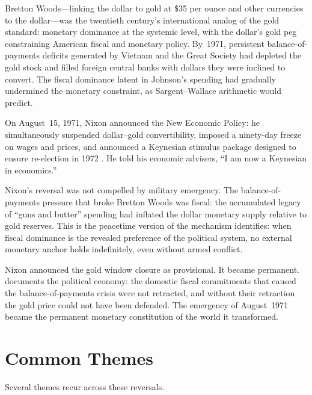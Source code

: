 \documentclass[12pt]{article}
\begin{document}
Bretton Woods---linking the dollar to gold at \$35 per ounce and other
currencies to the dollar---was the twentieth century's international
analog of the gold standard: monetary dominance at the systemic level,
with the dollar's gold peg constraining American fiscal and monetary
policy.  By~1971, persistent balance-of-payments deficits generated by
Vietnam and the Great Society had depleted the gold stock and filled
foreign central banks with dollars they were inclined to convert.  The
fiscal dominance latent in Johnson's spending had gradually undermined
the monetary constraint, as Sargent--Wallace arithmetic would predict.

On August~15, 1971, Nixon announced the New Economic Policy: he
simultaneously suspended dollar--gold convertibility, imposed a
ninety-day freeze on wages and prices, and announced a Keynesian
stimulus package designed to ensure re-election in 1972
\citep{Matusow1998}.  He told his economic advisers, ``I am now a
Keynesian in economics.''

Nixon's reversal was not compelled by military emergency.  The
balance-of-payments pressure that broke Bretton Woods was fiscal: the
accumulated legacy of ``guns and butter'' spending had inflated the
dollar monetary supply relative to gold reserves.  This is the peacetime
version of the mechanism \citet{Sargent2011} identifies: when fiscal
dominance is the revealed preference of the political system, no
external monetary anchor holds indefinitely, even without armed conflict.

Nixon announced the gold window closure as provisional.  It became
permanent.  \citet{Gowa1983} documents the political economy: the
domestic fiscal commitments that caused the balance-of-payments crisis
were not retracted, and without their retraction the gold price could
not have been defended.  The emergency of August~1971 became the
permanent monetary constitution of the world it transformed.


\section{Common Themes}

Several themes recur across these reversals.
\end{document}
